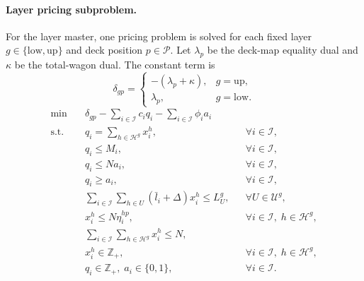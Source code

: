 \paragraph{Layer pricing subproblem.}
For the layer master, one pricing problem is solved for each fixed layer \(g\in\{\mathrm{low},\mathrm{up}\}\) and deck position \(p\in\mathcal P\).  Let \(\lambda_p\) be the deck-map equality dual and \(\kappa\) be the total-wagon dual.  The constant term is
\[
\delta_{gp}=
\begin{cases}
-(\lambda_p+\kappa), & g=\mathrm{up},\\
\lambda_p, & g=\mathrm{low}.
\end{cases}
\]
\begin{align}
\min \quad & \delta_{gp}-\sum_{i\in\mathcal I} c_i q_i-\sum_{i\in\mathcal I}\phi_i a_i \\
\text{s.t.}\quad & q_i=\sum_{h\in\mathcal H^g}x_i^h, &&\forall i\in\mathcal I,\\
& q_i\le M_i, &&\forall i\in\mathcal I,\\
& q_i\le N a_i, &&\forall i\in\mathcal I,\\
& q_i\ge a_i, &&\forall i\in\mathcal I,\\
& \sum_{i\in\mathcal I}\sum_{h\in U}(\bar l_i+\Delta)x_i^h\le L_U^g, &&\forall U\in\mathcal U^g,\\
& x_i^h\le N\eta_i^{hp}, &&\forall i\in\mathcal I,\;h\in\mathcal H^g,\\
& \sum_{i\in\mathcal I}\sum_{h\in\mathcal H^g}x_i^h\le N,\\
& x_i^h\in\mathbb Z_+, &&\forall i\in\mathcal I,\;h\in\mathcal H^g,\\
& q_i\in\mathbb Z_+,\;a_i\in\{0,1\}, &&\forall i\in\mathcal I.
\end{align}
